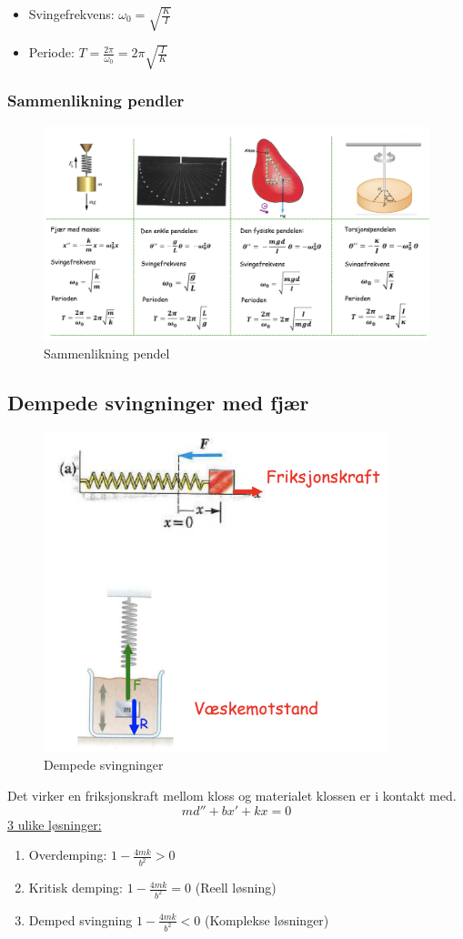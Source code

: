 \documentclass[12pt]{article}
\begin{document}
\begin{itemize}
    \item[] Svingefrekvens: $\omega_0 = \sqrt{\frac{K}{I}}$
    \item[] Periode: $T = \frac{2\pi}{\omega_0} = 2\pi\sqrt{\frac{I}{K}}$
\end{itemize}


\subsubsection{Sammenlikning pendler}
\begin{figure} [H]
    \centering
    \includegraphics[width = 13.5cm]{images/comparison.png}
    \caption{Sammenlikning pendel}
\end{figure}

\subsection{Dempede svingninger med fjær}
\begin{figure} [H]
    \centering
    \includegraphics[width = 10cm]{images/dempede.png}
    \caption{Dempede svingninger}
\end{figure}
Det virker en friksjonskraft mellom kloss og materialet klossen er i kontakt med.
$$md''+bx'+kx=0$$
\underline{3 ulike løsninger:}
\begin{enumerate}
    \item Overdemping: $1-\frac{4mk}{b^2} > 0$
    \item Kritisk demping: $1-\frac{4mk}{b^2} = 0$ (Reell løsning)
    \item Demped svingning $1-\frac{4mk}{b^2} < 0$ (Komplekse løsninger)
\end{enumerate}
\end{document}
